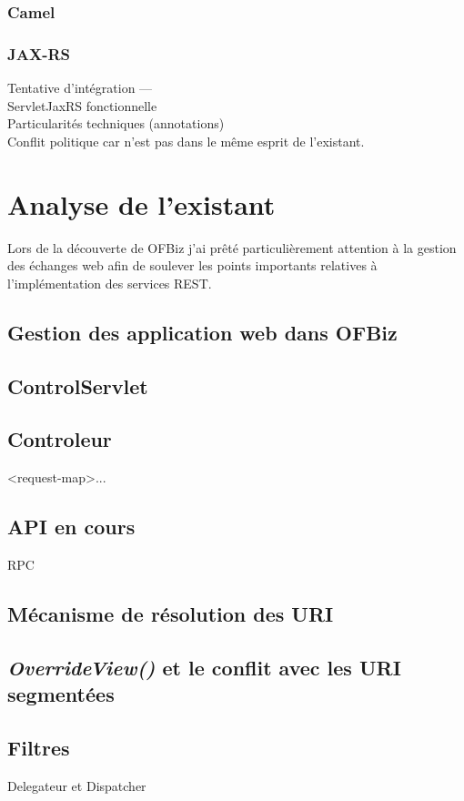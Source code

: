 \subsubsection{Camel}
\subsubsection{JAX-RS}
Tentative d'intégration ---\\
ServletJaxRS fonctionnelle\\
Particularités techniques (annotations) \\
Conflit politique car n'est pas dans le même esprit de l'existant.\\




\newpage

\section{Analyse de l'existant}

Lors de la découverte de OFBiz j'ai prêté  particulièrement attention à la gestion des échanges web afin de soulever les points importants relatives à l'implémentation des services REST. 


\subsection{Gestion des application web dans OFBiz}
\subsection{ControlServlet}
\subsection{Controleur}
<request-map>...
\subsection{API en cours}
RPC

\subsection{Mécanisme de résolution des URI}
\subsection{\textit{OverrideView()} et le conflit avec les URI segmentées}
\subsection{Filtres}
Delegateur et Dispatcher








